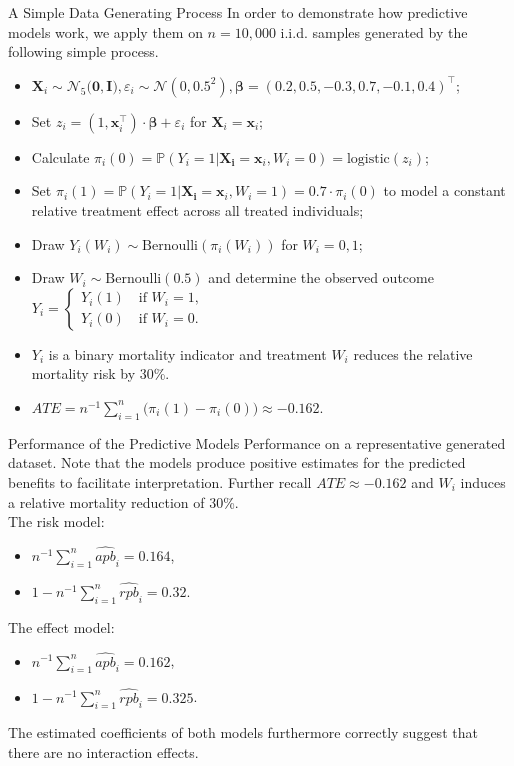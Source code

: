 \documentclass[11pt]{beamer}
\begin{document}
\begin{frame}{A Simple Data Generating Process}
In order to demonstrate how predictive models work, we apply them on $n=10,000$ i.i.d. samples generated by the following simple process.
\begin{itemize}
\item $\mathbf{X}_i \sim \mathcal{N}_5 \big(\mathbf{0}, \mathbf{I} \big), \varepsilon_i \sim \mathcal{N}(0, 0.5^2), \bm{\beta} = (0.2, 0.5, -0.3, 0.7, -0.1, 0.4)^\top$;
\item Set $z_i = (1, \mathbf{x}_i^\top) \cdot \bm{\beta} + \varepsilon_i$ for $\mathbf{X}_i = \mathbf{x}_i$;
\item Calculate $\pi_i(0) = \mathbb{P}(Y_i=1 | \mathbf{X_i}=\mathbf{x}_i, W_i=0)= \text{logistic}(z_i)$; 
\item Set $\pi_i(1) = \mathbb{P}(Y_i=1 | \mathbf{X_i}=\mathbf{x}_i, W_i=1) = 0.7 \cdot \pi_i(0)$ to model a \alert{constant relative treatment effect} across all treated individuals;
\item Draw $Y_i(W_i) \sim \text{Bernoulli}(\pi_i(W_i))$ for $W_i = 0,1$; 
\item Draw $W_i \sim \text{Bernoulli}(0.5)$ and determine the observed outcome 
$Y_i =
\begin{cases}
Y_i(1) \quad \text{if } W_i=1, \\
Y_i(0) \quad \text{if } W_i=0.
\end{cases}
$
\item[\ding{212}] $Y_i$ is a binary mortality indicator and treatment $W_i$ reduces the relative mortality risk by 30\%.
\item[\ding{212}] $ATE = n^{-1} \sum_{i=1}^n \big( \pi_i(1) - \pi_i(0) \big) \approx -0.162$.
\end{itemize}
\end{frame}


\begin{frame}{Performance of the Predictive Models}
Performance on a representative generated dataset. Note that the models produce positive estimates for the predicted benefits to facilitate interpretation. Further recall $ATE\approx -0.162$ and $W_i$ induces a relative mortality reduction of 30\%.\\
\medskip
The risk model:
\begin{itemize}
	\item $n^{-1}\sum_{i=1}^n \widehat{apb}_i = 0.164$,
	\item $1-n^{-1}\sum_{i=1}^n \widehat{rpb}_i = 0.32$. 
\end{itemize}
The effect model:
\begin{itemize}
	\item $n^{-1}\sum_{i=1}^n \widehat{apb}_i = 0.162$,
	\item $1-n^{-1}\sum_{i=1}^n \widehat{rpb}_i = 0.325$. 
\end{itemize}
The estimated coefficients of both models furthermore correctly suggest that there are no interaction effects.
\end{frame}
\end{document}
